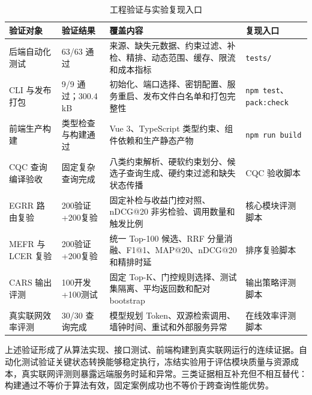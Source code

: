 \documentclass[a4paper,12pt,fontset=none]{ctexart}
\begin{document}
\begin{table}[H]
	\centering
	\caption{工程验证与实验复现入口}
	\label{tab:verification}
	\small
	\begin{tabularx}{\textwidth}{
			C{2.5cm}
			C{2.5cm}
			C{5.0cm}
			C{3.4cm}}
		\toprule
		\textbf{验证对象} &
		\textbf{验证结果} &
		\textbf{覆盖内容} &
		\textbf{复现入口} \\
		\midrule
		
		后端自动化测试 &
		63/63 通过 &
		来源、缺失元数据、约束过滤、补检、精排、动态范围、缓存、限流和成本指标 &
		\texttt{tests/} \\
		
		CLI 与发布打包 &
		9/9 通过；300.4\,kB &
		初始化、端口选择、密钥配置、服务重启、发布文件白名单和打包完整性 &
		\texttt{npm test}、\texttt{pack:check} \\
		
		前端生产构建 &
		类型检查与构建通过 &
		Vue 3、TypeScript 类型约束、组件依赖和生产静态产物 &
		\texttt{npm run build} \\
		
		CQC 查询编译验收 &
		固定复杂查询完成 &
		八类约束解析、硬软约束划分、候选子查询生成、硬约束过滤和缺失状态传播 &
		CQC 验收脚本 \\
		
		EGRR 路由复验 &
		200验证+200复验 &
		固定补检与收益门控对照、nDCG@20 非劣检验、调用数量和触发比例 &
		核心模块评测脚本 \\
		
		MEFR 与 LCER 复验 &
		200验证+200复验 &
		统一 Top-100 候选、RRF 分量消融、F1@1、MAP@20、nDCG@20和精排时延 &
		排序复验脚本 \\
		
		CARS 输出评测 &
		100开发+100测试 &
		固定 Top-K、门控规则选择、测试集隔离、平均返回数和配对 bootstrap &
		输出策略评测脚本 \\
		
		真实联网效率评测 &
		30/30 查询完成 &
		模型规划 Token、双源检索调用、墙钟时间、重试和外部服务异常 &
		在线效率评测脚本 \\
		\bottomrule
	\end{tabularx}
\end{table}

上述验证形成了从算法实现、接口测试、前端构建到真实联网运行的连续证据。自动化测试验证关键状态转换能够稳定执行，冻结实验用于评估模块质量与资源成本，真实联网评测则暴露远端服务时延和异常。三类证据相互补充但不相互替代：构建通过不等价于算法有效，固定案例成功也不等价于跨查询性能优势。
\end{document}
